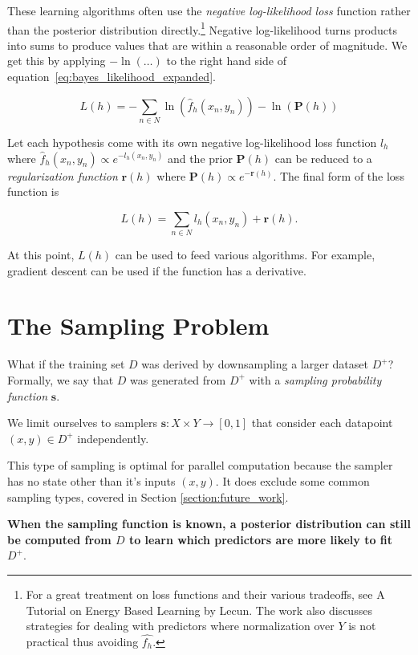 \documentclass[twoside]{article}
\begin{document}
These learning algorithms often use the \textit{negative log-likelihood loss} function rather than the posterior distribution directly.\footnote{For a great treatment on loss functions and their various tradeoffs, see A Tutorial on Energy Based Learning by Lecun\cite{lecun}. The work also discusses strategies for dealing with predictors where normalization over \(Y\) is not practical thus avoiding \(\hat{f_h}\).} Negative log-likelihood turns products into sums to produce values that are within a reasonable order of magnitude. We get this by applying \(-\ln(\ldots)\) to the right hand side of equation~\eqref{eq:bayes_likelihood_expanded}.

\[L(h)=-\sum_{n \in N} \ln(\hat{f}_h(x_n,y_n))-\ln(\mathbf{P}(h))\]

Let each hypothesis come with its own negative log-likelihood loss function \(l_h\) where \(\hat{f}_h(x_n,y_n)\propto e^{-l_h(x_n,y_n)}\) and the prior \(\mathbf{P}(h)\) can be reduced to a \textit{regularization function} \(\mathbf{r}(h)\) where \(\mathbf{P}(h)\propto e^{-\mathbf{r}(h)}\). The final form of the loss function is

\[L(h)=\sum_{n \in N} l_h(x_n,y_n)+\mathbf{r}(h).\]

At this point, \(L(h)\) can be used to feed various algorithms. For example, gradient descent can be used if the function has a derivative.

\pagebreak
\section{The Sampling Problem}
\label{section:problem}

What if the training set \(D\) was derived by downsampling a larger dataset \(D^+\)? Formally, we say that \(D\) was generated from \(D^+\) with a \textit{sampling probability function} \(\mathbf{s}\).

We limit ourselves to samplers \(\mathbf{s}: X \times Y \rightarrow \left [ 0, 1\right ]\) that consider each datapoint \((x, y) \in D^+\) independently.

This type of sampling is optimal for parallel computation because the sampler has no state other than it's inputs \((x, y)\). It does exclude some common sampling types, covered in Section \ref{section:future_work}.

\textbf{When the sampling function is known, a posterior distribution can still be computed from \(D\) to learn which predictors are more likely to fit \(D^+\)}.
\end{document}
